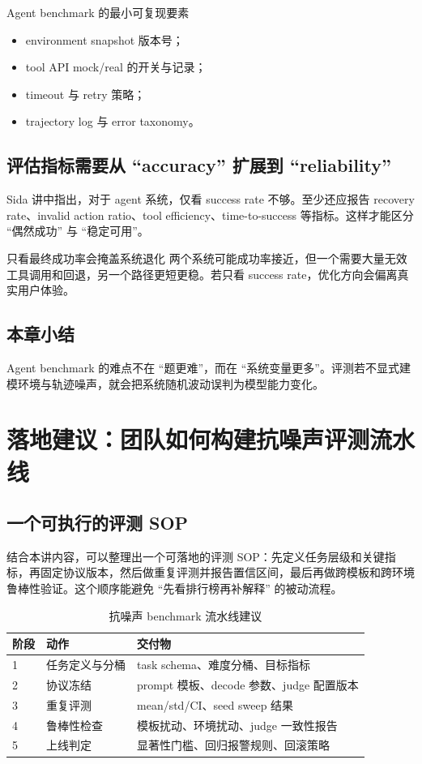 \documentclass[a4paper]{article}
\begin{document}
\begin{knowledgebox}{Agent benchmark 的最小可复现要素}
\begin{itemize}
    \item environment snapshot 版本号；
    \item tool API mock/real 的开关与记录；
    \item timeout 与 retry 策略；
    \item trajectory log 与 error taxonomy。
\end{itemize}
\end{knowledgebox}

\subsection{评估指标需要从 ``accuracy'' 扩展到 ``reliability''}
Sida 讲中指出，对于 agent 系统，仅看 success rate 不够。至少还应报告 recovery rate、invalid action ratio、tool efficiency、time-to-success 等指标。这样才能区分 ``偶然成功'' 与 ``稳定可用''。

\begin{warningbox}{只看最终成功率会掩盖系统退化}
两个系统可能成功率接近，但一个需要大量无效工具调用和回退，另一个路径更短更稳。若只看 success rate，优化方向会偏离真实用户体验。
\end{warningbox}

\subsection{本章小结}
Agent benchmark 的难点不在 ``题更难''，而在 ``系统变量更多''。评测若不显式建模环境与轨迹噪声，就会把系统随机波动误判为模型能力变化。

\section{落地建议：团队如何构建抗噪声评测流水线}

\subsection{一个可执行的评测 SOP}
结合本讲内容，可以整理出一个可落地的评测 SOP：先定义任务层级和关键指标，再固定协议版本，然后做重复评测并报告置信区间，最后再做跨模板和跨环境鲁棒性验证。这个顺序能避免 ``先看排行榜再补解释'' 的被动流程。

\begin{table}[H]
\centering
\begin{tabular}{p{1.2cm}p{3.7cm}p{5.3cm}}
\toprule
\textbf{阶段} & \textbf{动作} & \textbf{交付物} \\
\midrule
1 & 任务定义与分桶 & task schema、难度分桶、目标指标 \\
2 & 协议冻结 & prompt 模板、decode 参数、judge 配置版本 \\
3 & 重复评测 & mean/std/CI、seed sweep 结果 \\
4 & 鲁棒性检查 & 模板扰动、环境扰动、judge 一致性报告 \\
5 & 上线判定 & 显著性门槛、回归报警规则、回滚策略 \\
\bottomrule
\end{tabular}
\caption{抗噪声 benchmark 流水线建议}
\end{table}
\end{document}
